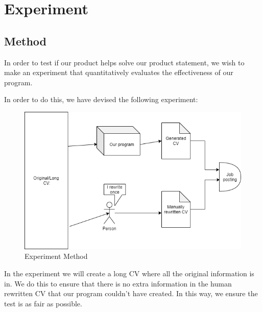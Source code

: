 \section{Experiment}\label{sec:method}
\subsection{Method}
In order to test if our product helps solve our product statement, we wish
to make an experiment that quantitatively evaluates the effectiveness of our
program. 

In order to do this, we have devised the following experiment:
\begin{figure}[H]
  \centering
  \includegraphics[scale = 0.6]{figures/experiment1.png}
  \caption{Experiment Method}\label{fig:ie}
\end{figure} 
In the experiment we will create a long CV where all the original information
is in. We do this to ensure that there is no extra information in the human 
rewritten CV that our program couldn't have created. In this way, we ensure
the test is as fair as possible.

